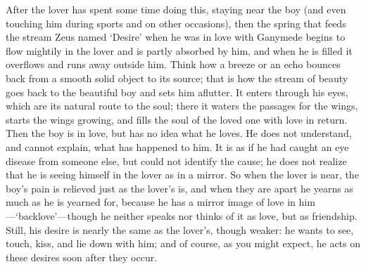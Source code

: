 After the lover has spent some time doing this, staying near the boy
(and even touching him during sports and on other occasions), then the
spring that feeds the stream Zeus named ‘Desire’ when he was in
love with Ganymede begins to flow mightily in the lover and is partly
absorbed by him, and when he is filled it overflows and runs away
outside him. Think how a breeze or an echo bounces back from a smooth
solid object to its source; that is how the stream of beauty goes back
to the beautiful boy and sets him aflutter. It enters through his eyes,
which are its natural route to the soul; there it waters the
passages for the wings, starts the wings growing, and fills the soul of
the loved one with love in return. Then the boy is in love, but has no
idea what he loves. He does not understand, and cannot explain, what has
happened to him. It is as if he had caught an eye disease from someone
else, but could not identify the cause; he does not realize that he is
seeing himself in the lover as in a mirror. So when the lover is near,
the boy’s pain is relieved just as the lover’s is, and when they are
apart he yearns as much as he is yearned for, because he has a
mirror image of love in him---‘backlove’---though he neither speaks nor
thinks of it as love, but as friendship. Still, his desire is nearly the
same as the lover’s, though weaker: he wants to see, touch, kiss, and
lie down with him; and of course, as you might expect, he acts on these
desires soon after they occur.

